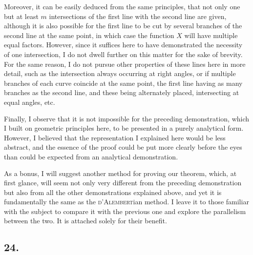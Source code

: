 \documentclass[12pt]{memoir}
\theoremstyle{plain}
\theoremstyle{remark}
\begin{document}
Moreover, it can be easily deduced from the same principles, that not only one but at least \(m\) intersections of the first line with the second line are given, although it is also possible for the first line to be cut by several branches of the second line at the same point, in which case the function \(X\) will have multiple equal factors. However, since it suffices here to have demonstrated the necessity of one intersection, I do not dwell further on this matter for the sake of brevity. For the same reason, I do not pursue other properties of these lines here in more detail, such as the intersection always occurring at right angles, or if multiple branches of each curve coincide at the same point, the first line having as many branches as the second line, and these being alternately placed, intersecting at equal angles, etc.

Finally, I observe that it is not impossible for the preceding demonstration, which I built on geometric principles here, to be presented in a purely analytical form. However, I believed that the representation I explained here would be less abstract, and the essence of the proof could be put more clearly before the eyes than could be expected from an analytical demonstration.

As a bonus, I will suggest another method for proving our theorem, which, at first glance, will seem not only very different from the preceding demonstration but also from all the other demonstrations explained above, and yet it is fundamentally the same as the \textsc{d'Alembert}ian method. I leave it to those familiar with the subject to compare it with the previous one and explore the parallelism between the two. It is attached solely for their benefit.

\subsection*{24.}
\end{document}
